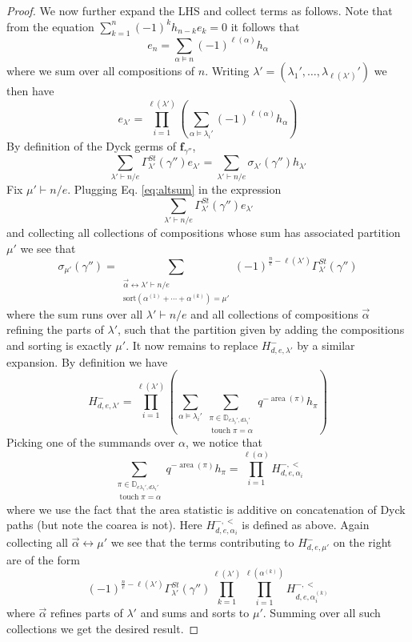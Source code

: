 \documentclass[10pt,a4paper]{amsart}
\newcommand{\Dyck}{\mathbb{D}}
\DeclareMathOperator{\area}{\mathrm{area}}
\DeclareMathOperator{\touch}{touch}
\begin{document}
\begin{proof}
We now further expand the LHS and collect terms as follows. Note that from the equation $\sum_{k=1}^n(-1)^k h_{n-k}e_k=0$ it follows that 
$$e_n=\sum_{\alpha \vDash n}(-1)^{\ell(\alpha)} h_\alpha$$ where we sum over all compositions of $n$.
Writing $\lambda'=(\lambda_1',\ldots,\lambda_{\ell(\lambda')}')$ we then have 
\begin{equation}
\label{eq:altsum}
e_{\lambda'}=\prod_{i=1}^{\ell(\lambda')}(\sum_{\alpha \vDash \lambda_i'} (-1)^{\ell(\alpha)}h_\alpha)
\end{equation}
By definition of the Dyck germs of $\mathbf{f}_{\gamma''}$, $$\sum_{\lambda'\vdash n/e} \Gamma^{St}_{\lambda'}(\gamma'')e_{\lambda'}=\sum_{\lambda'\vdash n/e} \sigma_{\lambda'}(\gamma'')h_{\lambda'}$$
Fix $\mu'\vdash n/e$. Plugging Eq. \eqref{eq:altsum} in the expression
$$\sum_{\lambda'\vdash n/e} \Gamma^{St}_{\lambda'}(\gamma'')e_{\lambda'}$$
and collecting all collections of compositions whose sum has associated partition $\mu'$ we see that
$$\sigma_{\mu'}(\gamma'')=\sum_{\substack{\vec{\alpha}\leftrightarrow \lambda'\vdash n/e\\\text{sort}(\alpha^{(1)}+\cdots+\alpha^{(k)})=\mu'}}
(-1)^{\frac{n}{e}-\ell(\lambda')}\Gamma^{St}_{\lambda'}(\gamma'')$$ where the sum runs over all $\lambda'\vdash n/e$ and all collections of compositions $\vec{\alpha}$ refining the parts of $\lambda'$, such that the partition given by adding the compositions and sorting is exactly $\mu'$.
It now remains to replace $H^-_{d,e,\lambda'}$ by a similar expansion.
By definition we have 
$$
H^-_{d,e,\lambda'}=\prod_{i=1}^{\ell(\lambda')}
(\sum_{\alpha\vDash \lambda_i'}\sum_{\substack{\pi \in \Dyck_{e\lambda_i',d\lambda_i'}\\ \touch{\pi}=\alpha}} q^{-\area(\pi)}h_\pi)
$$
Picking one of the summands over $\alpha$, we notice that  $$\sum_{\substack{\pi \in \Dyck_{e\lambda_i',d\lambda_i'}\\ \touch{\pi}=\alpha}} q^{-\area(\pi)}h_\pi=
\prod_{i=1}^{\ell(\alpha)}H^{-,<}_{d,e,\alpha_i}$$ 
where we use the fact that the area statistic is additive on concatenation of Dyck paths (but note the coarea is not). Here $H^{-,<}_{d,e,\alpha_i}$ is defined as above.
Again collecting all $\vec{\alpha}\leftrightarrow \mu'$ we see that 
the terms contributing to $H_{d,e,\mu'}^{-}$ on the right are of the form
$$(-1)^{\frac{n}{e}-\ell(\lambda')}\Gamma^{St}_{\lambda'}(\gamma'') \prod_{k=1}^{\ell(\lambda')}\prod_{i=1}^{\ell(\alpha^{(k)})}H^{-,<}_{d,e,\alpha^{(k)}_i}$$
where $\vec{\alpha}$ refines parts of $\lambda'$ and sums and sorts to $\mu'$. Summing over all such collections
we get the desired result.
\end{proof}
\end{document}
